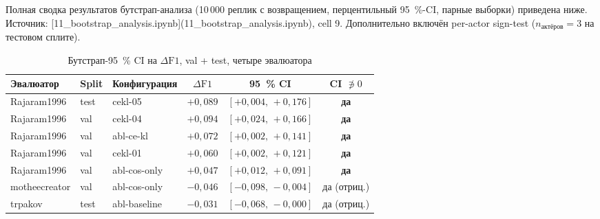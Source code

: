 \documentclass[a4paper, 12pt, oneside, openany]{article}
\begin{document}
\newpage
\section{\centering}\label{PrilG}
\begin{center}
\end{center}
\setcounter{equation}{0}
\renewcommand{\theequation}{\Asbuk{section}.\arabic{equation}}
\setcounter{table}{0}
\renewcommand{\thetable}{\Asbuk{section}.\arabic{table}}
\setcounter{figure}{0}
\renewcommand{\thefigure}{\Asbuk{section}.\arabic{figure}}

Полная сводка результатов бутстрап-анализа (10\,000 реплик с возвращением, перцентильный 95~\%-CI, парные выборки) приведена ниже. Источник: [11\_bootstrap\_analysis.ipynb](11\_bootstrap\_analysis.ipynb), cell 9. Дополнительно включён per-actor sign-test ($n_{\text{актёров}}=3$ на тестовом сплите).

\begin{table}[H]
\caption{Бутстрап-95~\% CI на $\Delta\mathrm{F1}$, val + test, четыре эвалюатора}
\label{tab:full_bootstrap}
\centering
\small
\begin{tabular}{|p{2cm}|p{1.7cm}|p{2.5cm}|c|c|c|}
\hline
\textbf{Эвалюатор} & \textbf{Split} & \textbf{Конфигурация} & $\Delta\mathrm{F1}$ & \textbf{95~\% CI} & \textbf{CI $\not\ni 0$} \\
\hline
Rajaram1996 & test & cekl-05 & $+0{,}089$ & $[+0{,}004,\,+0{,}176]$ & \textbf{да} \\
\hline
Rajaram1996 & val & cekl-04 & $+0{,}094$ & $[+0{,}024,\,+0{,}166]$ & \textbf{да} \\
\hline
Rajaram1996 & val & abl-ce-kl & $+0{,}072$ & $[+0{,}002,\,+0{,}141]$ & \textbf{да} \\
\hline
Rajaram1996 & val & cekl-01 & $+0{,}060$ & $[+0{,}002,\,+0{,}121]$ & \textbf{да} \\
\hline
Rajaram1996 & val & abl-cos-only & $+0{,}047$ & $[+0{,}012,\,+0{,}091]$ & \textbf{да} \\
\hline
motheecreator & val & abl-cos-only & $-0{,}046$ & $[-0{,}098,\,-0{,}004]$ & да (отриц.) \\
\hline
trpakov & test & abl-baseline & $-0{,}031$ & $[-0{,}068,\,-0{,}000]$ & да (отриц.) \\
\hline
\end{tabular}
\end{table}
\end{document}
